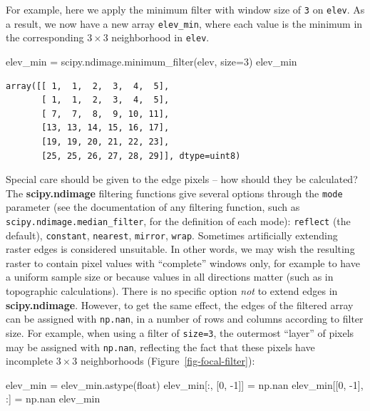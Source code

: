 \documentclass[
  letterpaper,
]{krantz}
\newenvironment{Shaded}{\begin{snugshade}}{\end{snugshade}}
\newcommand{\BuiltInTok}[1]{\textcolor[rgb]{0.00,0.23,0.31}{#1}}
\newcommand{\DecValTok}[1]{\textcolor[rgb]{0.68,0.00,0.00}{#1}}
\newcommand{\NormalTok}[1]{\textcolor[rgb]{0.00,0.23,0.31}{#1}}
\newcommand{\OperatorTok}[1]{\textcolor[rgb]{0.37,0.37,0.37}{#1}}
\begin{document}
For example, here we apply the minimum filter with window size of
\texttt{3} on \texttt{elev}. As a result, we now have a new array
\texttt{elev\_min}, where each value is the minimum in the corresponding
\(3 \times 3\) neighborhood in \texttt{elev}.

\begin{Shaded}
\begin{Highlighting}[]
\NormalTok{elev\_min }\OperatorTok{=}\NormalTok{ scipy.ndimage.minimum\_filter(elev, size}\OperatorTok{=}\DecValTok{3}\NormalTok{)}
\NormalTok{elev\_min}
\end{Highlighting}
\end{Shaded}

\begin{verbatim}
array([[ 1,  1,  2,  3,  4,  5],
       [ 1,  1,  2,  3,  4,  5],
       [ 7,  7,  8,  9, 10, 11],
       [13, 13, 14, 15, 16, 17],
       [19, 19, 20, 21, 22, 23],
       [25, 25, 26, 27, 28, 29]], dtype=uint8)
\end{verbatim}

Special care should be given to the edge pixels -- how should they be
calculated? The \textbf{scipy.ndimage} filtering functions give several
options through the \texttt{mode} parameter (see the documentation of
any filtering function, such as \texttt{scipy.ndimage.median\_filter},
for the definition of each mode): \texttt{reflect} (the default),
\texttt{constant}, \texttt{nearest}, \texttt{mirror}, \texttt{wrap}.
Sometimes artificially extending raster edges is considered unsuitable.
In other words, we may wish the resulting raster to contain pixel values
with ``complete'' windows only, for example to have a uniform sample
size or because values in all directions matter (such as in topographic
calculations). There is no specific option \emph{not} to extend edges in
\textbf{scipy.ndimage}. However, to get the same effect, the edges of
the filtered array can be assigned with \texttt{np.nan}, in a number of
rows and columns according to filter size. For example, when using a
filter of \texttt{size=3}, the outermost ``layer'' of pixels may be
assigned with \texttt{np.nan}, reflecting the fact that these pixels
have incomplete \(3 \times 3\) neighborhoods
(Figure~\ref{fig-focal-filter}):

\begin{Shaded}
\begin{Highlighting}[]
\NormalTok{elev\_min }\OperatorTok{=}\NormalTok{ elev\_min.astype(}\BuiltInTok{float}\NormalTok{)}
\NormalTok{elev\_min[:, [}\DecValTok{0}\NormalTok{, }\OperatorTok{{-}}\DecValTok{1}\NormalTok{]] }\OperatorTok{=}\NormalTok{ np.nan}
\NormalTok{elev\_min[[}\DecValTok{0}\NormalTok{, }\OperatorTok{{-}}\DecValTok{1}\NormalTok{], :] }\OperatorTok{=}\NormalTok{ np.nan}
\NormalTok{elev\_min}
\end{Highlighting}
\end{Shaded}
\end{document}
